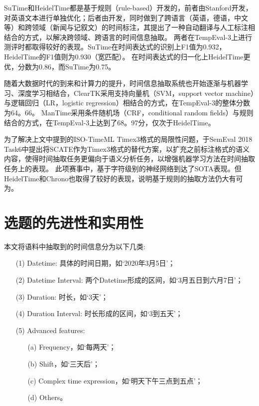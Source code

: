 SuTime和HeidelTime都是基于规则（rule-based）开发的，前者由Stanford开发，对英语文本进行单独优化；后者由\citet{strotgen2010heideltime}开发，同时做到了跨语言（英语，德语，中文等）和跨领域（新闻与记叙文）的时间标注，其提出了一种自动翻译与人工标注相结合的方式，以解决跨领域、跨语言的时间信息抽取。
两者在TempEval-3上进行测评时都取得较好的表现。SuTime在时间表达式的识别上F1值为0.932，HeidelTime的F1值则为0.930（宽匹配）。
在时间表达式的归一化上HeidelTime更优，分数为0.86，而SuTime为0.75。

随着大数据时代的到来和计算力的提升，时间信息抽取系统也开始逐渐与机器学习、深度学习相结合，ClearTK\cite{bethard2013cleartk}采用支持向量机（SVM，support vector machine）与逻辑回归（LR，logistic regression）相结合的方式，在TempEval-3的整体分数为64。66。
ManTime\cite{filannino2013mantime}采用条件随机场（CRF，conditional random fields）与规则结合的方式，在TempEval-3上达到了68。97分，仅次于HeidelTime。

为了解决上文中提到的ISO-TimeML Timex3格式的局限性问题，\citet{laparra2018characters}于SemEval 2018 Task6中提出将SCATE作为Timex3格式的替代方案，以扩充之前标注格式的语义内容，使得时间抽取任务更偏向于语义分析任务，以增强机器学习方法在时间抽取任务上的表现。
此项赛事中，\citet{laparra2018characters}基于字符级别的神经网络到达了SOTA表现。但HeidelTime和Chrono也取得了较好的表现，说明基于规则的抽取方法仍大有可为。

\section{选题的先进性和实用性}

本文将语料中抽取到的时间信息分为以下几类:
\begin{enumerate}
    \item[(1)]  Datetime: 具体的时间日期，如‘2020年3月5日’；
    \item[(2)]  Datetime Interval: 两个Datetime形成的区间，如‘3月五日到六月7日’；
    \item[(3)]  Duration: 时长，如‘3天’；
    \item[(4)]  Duration Interval: 时长形成的区间，如‘3到五天’；
    \item[(5)]  Advanced features:
        \begin{enumerate}
            \item[(a)]  Frequency，如‘每两天’；
            \item[(b)]   Shift，如‘三天后’；
            \item[(c)]  Complex time expression，如‘明天下午三点到五点’；
            \item[(d)] Others。
        \end{enumerate}
\end{enumerate}

